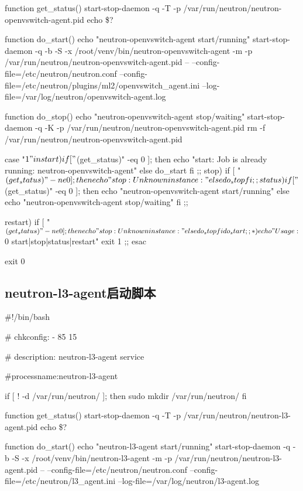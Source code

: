 \documentclass[a4paper,left=1.5cm,right=1.5cm,11pt]{article}
\begin{document}
function get_status(){
    start-stop-daemon -q -T -p /var/run/neutron/neutron-openvswitch-agent.pid
    echo \$?
}

function do_start(){
    echo "neutron-openvswitch-agent start/running"
    start-stop-daemon -q -b -S -x /root/venv/bin/neutron-openvswitch-agent -m -p /var/run/neutron/neutron-openvswitch-agent.pid -- --config-file=/etc/neutron/neutron.conf --config-file=/etc/neutron/plugins/ml2/openvswitch_agent.ini --log-file=/var/log/neutron/openvswitch-agent.log
}

function do_stop(){
    echo "neutron-openvswitch-agent stop/waiting"
    start-stop-daemon -q -K -p /var/run/neutron/neutron-openvswitch-agent.pid
    rm -f /var/run/neutron/neutron-openvswitch-agent.pid
}

case "$1" in

  start)
        if [ "$(get_status)" -eq 0 ]; then
            echo "start: Job is already running: neutron-openvswitch-agent"
        else
            do_start
        fi
        ;;
  stop)
        if [ "$(get_status)" -ne 0 ]; then
            echo "stop: Unknown instance:"
        else
            do_stop
        fi
        ;;

  status)
        if [ "$(get_status)" -eq 0 ]; then
            echo "neutron-openvswitch-agent start/running"
        else
            echo "neutron-openvswitch-agent stop/waiting"
        fi
        ;;

  restart)
        if [ "$(get_status)" -ne 0 ]; then
            echo "stop: Unknown instance:"
        else
            do_stop
        fi
        do_start
        ;;

  *)
        echo "Usage: $0 {start|stop|status|restart}"
        exit 1
        ;;
esac

exit 0
\subsection{neutron-l3-agent启动脚本}
#!/bin/bash

# chkconfig:  - 85 15  

# description: neutron-l3-agent  service

#processname:neutron-l3-agent

if [ ! -d /var/run/neutron/ ]; then
   sudo mkdir /var/run/neutron/
fi

function get_status(){
    start-stop-daemon -q -T -p /var/run/neutron/neutron-l3-agent.pid
    echo \$?
}

function do_start(){
    echo "neutron-l3-agent start/running"
    start-stop-daemon -q -b -S -x /root/venv/bin/neutron-l3-agent -m -p /var/run/neutron/neutron-l3-agent.pid -- --config-file=/etc/neutron/neutron.conf --config-file=/etc/neutron/l3_agent.ini --log-file=/var/log/neutron/l3-agent.log
}
\end{document}
